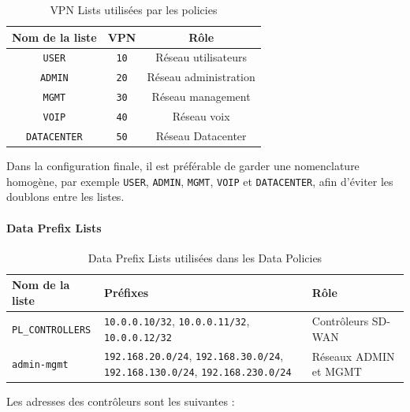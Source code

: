 \documentclass[12pt,a4paper,oneside]{report}
\begin{document}
	\begin{table}[H]
		\centering
		\renewcommand{\arraystretch}{1.2}
		\begin{tabular}{|c|c|c|}
			\hline
			\textbf{Nom de la liste} & \textbf{VPN} & \textbf{Rôle} \\
			\hline
			\texttt{USER} & \texttt{10} & Réseau utilisateurs \\
			\hline
			\texttt{ADMIN} & \texttt{20} & Réseau administration \\
			\hline
			\texttt{MGMT} & \texttt{30} & Réseau management \\
			\hline
			\texttt{VOIP} & \texttt{40} & Réseau voix \\
			\hline
			\texttt{DATACENTER} & \texttt{50} & Réseau Datacenter \\
			\hline
		\end{tabular}
		\caption{VPN Lists utilisées par les policies}
		\label{tab:vpn-lists-policies}
	\end{table}
	
	Dans la configuration finale, il est préférable de garder une nomenclature homogène, par exemple \texttt{USER}, \texttt{ADMIN}, \texttt{MGMT}, \texttt{VOIP} et \texttt{DATACENTER}, afin d'éviter les doublons entre les listes.
	
	\paragraph{Data Prefix Lists}
	
	\begin{table}[H]
		\centering
		\renewcommand{\arraystretch}{1.2}
		\begin{tabular}{|p{}|p{}|p{}|}
			\hline
			\textbf{Nom de la liste} & \textbf{Préfixes} & \textbf{Rôle} \\
			\hline
			\texttt{PL\_CONTROLLERS} & 
			\texttt{10.0.0.10/32}, \texttt{10.0.0.11/32}, \texttt{10.0.0.12/32} & 
			Contrôleurs SD-WAN \\
			\hline
			\texttt{admin-mgmt} & 
			\texttt{192.168.20.0/24}, \texttt{192.168.30.0/24}, \texttt{192.168.130.0/24}, \texttt{192.168.230.0/24} & 
			Réseaux ADMIN et MGMT \\
			\hline
		\end{tabular}
		\caption{Data Prefix Lists utilisées dans les Data Policies}
		\label{tab:data-prefix-lists-policies}
	\end{table}
	
	Les adresses des contrôleurs sont les suivantes :
	
\end{document}
